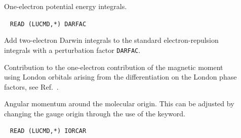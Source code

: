 \begin{description}
\item[] One-electron potential energy integrals.


\item[]\verb| |\newline
\verb|READ (LUCMD,*) DARFAC|


Add two-electron Darwin integrals to the standard electron-repulsion
integrals with a perturbation factor \verb|DARFAC|.

\item[] Contribution to the one-electron contribution of
the magnetic moment using London orbitals
 arising from the differentiation on the
London phase factors, see Ref.~\cite{thpjjcp95}.


\item[] Angular momentum around the molecular origin.
This can be adjusted by changing the gauge origin through the use of
the  keyword.


\item[]\verb| |\newline
\verb|READ (LUCMD,*) IORCAR|


\end{description}
